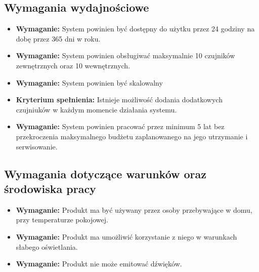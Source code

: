 \documentclass{article}
\begin{document}
\subsection{Wymagania wydajnościowe}
\begin{itemize}
\item \textbf{Wymaganie:} System powinien być dostępny do użytku przez 24 godziny na dobę przez 365 dni w roku.\\
\end{itemize}
\begin{itemize}
\item \textbf{Wymaganie:} System powinien obsługiwać maksymalnie 10 czujników zewnętrznych oraz 10 wewnętrznych.\\
\end{itemize}
\begin{itemize}
\item \textbf{Wymaganie:} System powinien być skalowalny
\item \textbf{Kryterium spełnienia:} Istnieje możliwość dodania dodatkowych czujniuków w każdym momencie działania systemu.\\ 
\end{itemize}
\begin{itemize}
\item \textbf{Wymaganie:} System powinien pracować przez minimum 5 lat bez przekroczenia maksymalnego budżetu zaplanowanego na jego utrzymanie i serwisowanie.\\
\end{itemize}

\subsection{Wymagania dotyczące warunków oraz środowiska pracy}
\begin{itemize}
\item \textbf{Wymaganie:} Produkt ma być używany przez osoby przebywające w domu, przy temperaturze pokojowej.\\
\end{itemize}
\begin{itemize}
\item \textbf{Wymaganie:} Produkt ma umożliwić korzystanie z niego w warunkach słabego oświetlania.\\
\end{itemize}
\begin{itemize}
\item \textbf{Wymaganie:} Produkt nie może emitować dźwięków.
\end{itemize}
\end{document}

